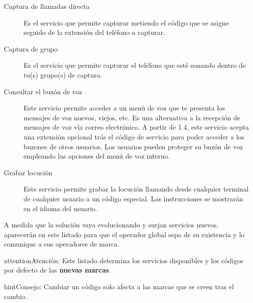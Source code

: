 \documentclass[letterpaper,10pt,spanish]{sphinxmanual}
\begin{document}
\noindent{}
\begin{description}
\item[{Captura de llamadas directa}] \leavevmode{}\label{pbx_features/services:term-direct-pickup}
Es el servicio que permite capturar metiendo el código que se asigne seguido de la extensión del teléfono a capturar.

\item[{Captura de grupo}] \leavevmode{}\label{pbx_features/services:term-group-pickup}
Es el servicio que permite capturar el teléfono que esté sonando dentro de tu(s) grupo(s) de captura.

\item[{Consultar el buzón de voz}] \leavevmode{}\label{pbx_features/services:term-check-voicemail}
Este servicio permite acceder a un menú de voz que te presenta los mensajes de voz nuevos, viejos, etc. Es una alternativa a la recepción de mensajes de voz vía correo electrónico. A partir de 1.4, este servicio acepta una extensión opcional trás el código de servicio para poder acceder a los buzones de otros usuarios. Los usuarios pueden proteger su buzón de voz empleando las opciones del menú de voz interno.

\item[{Grabar locución}] \leavevmode{}\label{pbx_features/services:term-record-locution}
Este servicio permite grabar la locución llamando desde cualquier terminal de cualquier usuario a un código especial. Las instrucciones se mostrarán en el idioma del usuario.

\end{description}

A medida que la solución vaya evolucionando y surjan servicios nuevos, aparecerán en este listado para que el operador global sepa de su existencia y lo comunique a sus operadores de marca.

\begin{notice}{attention}{Atención:}
Este listado determina los servicios disponibles y los códigos por defecto de las \textbf{nuevas marcas}.
\end{notice}

\begin{notice}{hint}{Consejo:}
Cambiar un código solo afecta a las marcas que se creen tras el cambio.
\end{notice}
\end{document}
